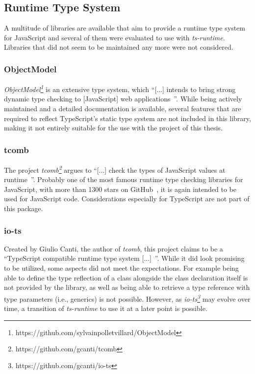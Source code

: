 
\subsection{Runtime Type System}
\label{sec:runtime-type-system}

A multitude of libraries are available that aim to provide a runtime type system for JavaScript and several of them were evaluated to use with \emph{ts-runtime}. Libraries that did not seem to be maintained any more were not considered.

\subsubsection{ObjectModel}

\emph{ObjectModel\footnote{https://github.com/sylvainpolletvillard/ObjectModel}} is an extensive type system, which ``[...] intends to bring strong dynamic type checking to [JavaScript] web applications~\cite{RuntimeTypeSystem:ObjectModel}''. While being actively maintained and a detailed documentation is available, several features that are required to reflect TypeScript's static type system are not included in this library, making it not entirely suitable for the use with the project of this thesis.

\subsubsection{tcomb}

The project \emph{tcomb\footnote{https://github.com/gcanti/tcomb}} argues to ``[...] check the types of JavaScript values at runtime~\cite{RuntimeTypeSystem:tcomb}''. Probably one of the most famous runtime type checking libraries for JavaScript, with more than 1300 stars on GitHub~\cite{RuntimeTypeSystem:tcomb}, it is again intended to be used for JavaScript code. Considerations especially for TypeScript are not part of this package.

\subsubsection{io-ts}

Created by Giulio Canti, the author of \emph{tcomb}, this project claims to be a ``TypeScript compatible runtime type system [...]~\cite{RuntimeTypeSystem:io-ts}''. While it did look promising to be utilized, some aspects did not meet the expectations. For example being able to define the type reflection of a class alongside the class declaration itself is not provided by the library, as well as being able to retrieve a type reference with type parameters (i.e., generics) is not possible. However, as \emph{io-ts\footnote{https://github.com/gcanti/io-ts}} may evolve over time, a transition of \emph{ts-runtime} to use it at a later point is possible.

